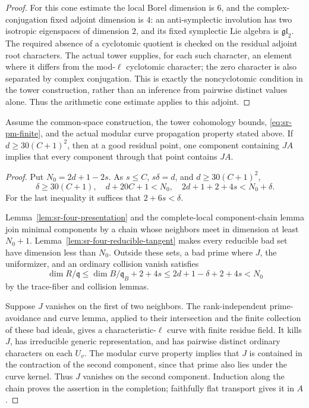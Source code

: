 \begin{proof}
For this cone estimate the local Borel dimension is \(6\),
and the complex-conjugation fixed adjoint dimension is \(4\):
an anti-symplectic involution has two isotropic eigenspaces of
dimension \(2\), and its fixed symplectic Lie algebra is
\(\mathfrak{gl}_2\).
The required absence of a cyclotomic quotient is checked on the
residual adjoint root characters. The actual tower supplies,
for each such character, an element where it differs from the
mod-\(\ell\) cyclotomic character; the zero character is also
separated by complex conjugation. This is exactly the
noncyclotomic condition in the tower construction, rather than
an inference from pairwise distinct values alone.
Thus the arithmetic cone estimate applies to this adjoint.
\end{proof}

\begin{srproposition}
\label{prop:sr-four-core}
Assume the common-space construction, the tower cohomology
bounds, \eqref{eq:sr-pm-finite}, and the actual modular curve
propagation property stated above.
If \(d\ge30(C+1)^2\), then at a good residual point, one
component containing \(JA\) implies that every component
through that point contains \(JA\).
\end{srproposition}
\begin{proof}
Put \(N_0=2d+1-2s\).
As \(s\le C\), \(s\delta=d\), and \(d\ge30(C+1)^2\),
\[
 \delta\ge30(C+1),\quad
 d+20C+1<N_0,\quad
 2d+1+2+4s<N_0+\delta.
\]
For the last inequality it suffices that \(2+6s<\delta\).

Lemma~\ref{lem:sr-four-presentation} and the complete-local
component-chain lemma join minimal components by a chain whose
neighbors meet in dimension at least \(N_0+1\).
Lemma~\ref{lem:sr-four-reducible-tangent} makes every reducible
bad set have dimension less than \(N_0\).
Outside these sets, a bad prime where \(J\), the uniformizer,
and an ordinary collision vanish satisfies
\[
 \dim R/\mathfrak q\le
 \dim B/\mathfrak q_B+2+4s
 \le2d+1-\delta+2+4s<N_0
\]
by the trace-fiber and collision lemmas.

Suppose \(J\) vanishes on the first of two neighbors.
The rank-independent prime-avoidance and curve lemma, applied
to their intersection and the finite collection of these bad
ideals, gives a characteristic-\(\ell\) curve with finite
residue field. It kills \(J\), has irreducible generic
representation, and has pairwise distinct ordinary characters
on each \(U_v\).
The modular curve property implies that \(J\) is contained in
the contraction of the second component, since that prime
also lies under the curve kernel.
Thus \(J\) vanishes on the second component.
Induction along the chain proves the assertion in the
completion; faithfully flat transport gives it in \(A\).
\end{proof}

